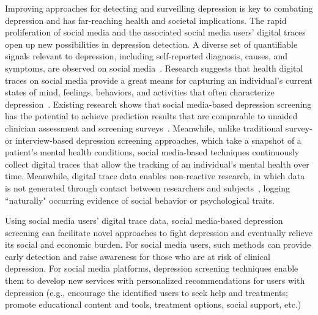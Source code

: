 Improving approaches for detecting and surveilling depression is key to combating depression and has far-reaching health and societal implications. The rapid proliferation of social media and the associated social media users' digital traces open up new possibilities in depression detection. A diverse set of quantiﬁable signals relevant to depression, including self-reported diagnosis, causes, and symptoms, are observed on social media~\citep{coppersmith_measuring_2014,coppersmith_quantifying_2014, nadeem_identifying_2016}. Research suggests that health digital traces on social media provide a great means for capturing an individual's current states of mind, feelings, behaviors, and activities that often characterize depression~\citep{choudhury_predicting_2013,nadeem_identifying_2016}. Existing research shows that social media-based depression screening has the potential to achieve prediction results that are comparable to unaided clinician assessment and screening surveys~\citep{guntuku_detecting_2017}. Meanwhile, unlike traditional survey- or interview-based depression screening approaches, which take a snapshot of a patient's mental health conditions, social media-based techniques continuously collect digital traces that allow the tracking of an individual's mental health over time. Meanwhile, digital trace data enables non-reactive research, in which data is not generated through contact between researchers and subjects~\citep{salganik_bit_2019}, logging ``naturally" occurring evidence of social behavior or psychological traits. 

Using social media users' digital trace data, social media-based depression screening can facilitate novel approaches to fight depression and eventually relieve its social and economic burden. For social media users, such methods can provide early detection and raise awareness for those who are at risk of clinical depression. For social media platforms, depression screening techniques enable them to develop new services with personalized recommendations for users with depression (e.g., encourage the identified users to seek help and treatments; promote educational content and tools, treatment options, social support, etc.)

